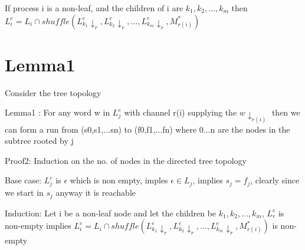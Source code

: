 \documentclass{article}
\begin{document}
If process i is a non-leaf, and the children of i are $k_1, k_2, ..., k_m$ then $L_i^e = L_i \cap shuffle(L_{k_1}^e\!\!\!\downarrow_{r}, L_{k_2}^e\!\!\!\downarrow_{r}, ..., L_{k_m}^e\!\!\!\downarrow_{r}, M_{r(i)}^*)$


\section{Lemma1}




















Consider the tree topology

Lemma1 : For any word w in $L_j^e$ with channel r(i) supplying the $w \downarrow_{r(i)}$ then  we can form a run from (s0,s1,...sn) to (f0,f1,...fn) where {0...n} are the nodes in the subtree rooted by j

Proof2: Induction on the no. of nodes in the directed tree topology

Base case: $L_j^e$ is $\epsilon$ which is non empty, imples $\epsilon \in L_j$, implies $s_j = f_j$, clearly since we start in $s_j$ anyway it is reachable

Induction: 
Let i be a non-leaf node and let the children be $k_1, k_2, ..., k_m$,  $L_r^e$ is non-empty implies $L_i^e = L_i \cap shuffle(L_{k_1}^e\!\!\!\downarrow_{r}, L_{k_2}^e\!\!\!\downarrow_{r}, ..., L_{k_m}^e\!\!\!\downarrow_{r}, M_{r(i)}^*)$ is non-empty
\end{document}
